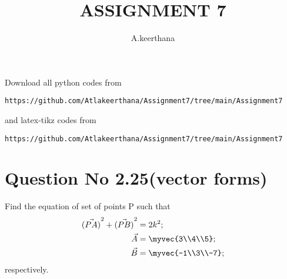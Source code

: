 \documentclass[journal,12pt,twocolumn]{IEEEtran}
\begin{document}
     \def\rightbox#1{\makebox[0in][r]{#1}}
     \def\centbox#1{\makebox[0in]{#1}}
     \def\topbox#1{\raisebox{-\baselineskip}[0in][0in]{#1}}
     \def\midbox#1{\raisebox{-0.5\baselineskip}[0in][0in]{#1}}
\vspace{3cm}
\title{ASSIGNMENT 7}
\author{A.keerthana}
\maketitle
\newpage
\bigskip
\renewcommand{\thefigure}{\theenumi}
\renewcommand{\thetable}{\theenumi}
Download all python codes from 
\begin{lstlisting}
https://github.com/Atlakeerthana/Assignment7/tree/main/Assignment7
\end{lstlisting}
%
and latex-tikz codes from 
%
\begin{lstlisting}
https://github.com/Atlakeerthana/Assignment7/tree/main/Assignment7
\end{lstlisting}
%
\section{Question No 2.25(vector forms)}
Find the equation of set of points P such that 
\begin{align}
 \vec{(PA)}^2+ \vec{(PB)}^2 &=2k^2;
 \\
  \vec A &=\myvec{3\\4\\5};
  \\
  \vec B &=\myvec{-1\\3\\-7};
\end{align}
respectively.
%
\end{document}
